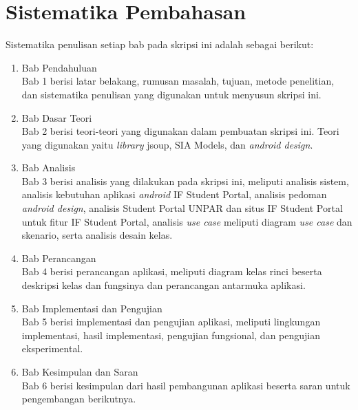 \section{Sistematika Pembahasan}
\label{sec:sispem}
Sistematika penulisan setiap bab pada skripsi ini adalah sebagai berikut:

\begin{enumerate}
  \item Bab Pendahuluan \\
  Bab 1 berisi latar belakang, rumusan masalah, tujuan, metode penelitian,
  dan sistematika penulisan yang digunakan untuk menyusun skripsi ini.
  \item Bab Dasar Teori \\
  Bab 2 berisi teori-teori yang digunakan dalam pembuatan skripsi ini. Teori
  yang digunakan yaitu \textit{library} jsoup, SIA Models, dan \textit{android design}.
  \item Bab Analisis \\
  Bab 3 berisi analisis yang dilakukan pada skripsi ini, meliputi analisis sistem, analisis kebutuhan aplikasi \textit{android} IF Student Portal, analisis pedoman \textit{android design}, analisis Student Portal UNPAR dan situs IF Student Portal untuk fitur IF Student Portal, analisis \textit{use case} meliputi diagram \textsl{use case} dan skenario, serta analisis desain kelas. 
  \item Bab Perancangan \\
  Bab 4 berisi perancangan aplikasi, meliputi diagram kelas rinci beserta deskripsi kelas dan fungsinya dan perancangan antarmuka aplikasi.   
  \item Bab Implementasi dan Pengujian \\
  Bab 5 berisi implementasi dan pengujian aplikasi, meliputi lingkungan implementasi, hasil implementasi, pengujian fungsional, dan pengujian eksperimental.
  \item Bab Kesimpulan dan Saran \\
  Bab 6 berisi kesimpulan dari hasil pembangunan aplikasi beserta saran untuk pengembangan berikutnya.
\end{enumerate}
